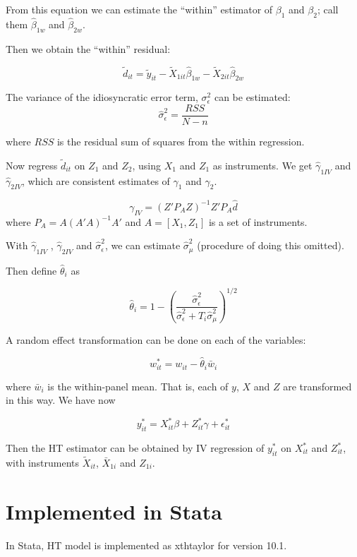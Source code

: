 From this equation we can estimate the ``within'' estimator of
$\beta_1$ and $\beta_2$; call them $\hat \beta_{1w}$ and $\hat
\beta_{2w}$. 

Then we obtain the ``within'' residual:

\[ \tilde d_{it} = \tilde y_{it} - \tilde X_{1it} \hat \beta_{1w} -
\tilde X_{2it} \hat \beta_{2w} \]

The variance of the idiosyncratic error term, $\sigma^2_{\epsilon}$
can be estimated:
\[ \hat \sigma^2_{\epsilon} = \frac{RSS}{N-n} \]

where $RSS$ is the residual sum of squares from the within regression.

Now regress $\tilde d_{it}$ on $Z_1$ and $Z_2$, using $X_1$ and $Z_1$
as instruments.  We get $\hat \gamma_{1IV}$ and $\hat \gamma_{2IV}$,
which are consistent estimates of $\gamma_1$ and $\gamma_2$.

\[ \gamma_{IV}=(Z' P_A Z)^{-1} Z' P_A \hat d \]
where $P_A = A(A'A)^{-1}A' $ and $A= [X_1, Z_1]$ is a set of instruments.

With  $\hat \gamma_{1IV}$ ,  $\hat \gamma_{2IV}$ and $\hat \sigma_{\epsilon}^2$, we can estimate
$\hat \sigma_{\mu}^2$ (procedure of doing this omitted).

Then define $\hat \theta_i$ as

\[\hat \theta_i = 1 - (\frac{\hat \sigma_{\epsilon}^2}{\hat
  \sigma_{\epsilon}^2 + T_i \hat \sigma_{\mu}^2})^{1/2}\]

A random effect transformation can be done on each of the variables:

\[ w_{it}^* = w_{it} - \hat \theta_i \bar w_i \]

where $\bar w_i$ is the within-panel mean.  That is, each of $y$, $X$
and $Z$ are transformed in this way.  We have now 

\[ y_{it}^* = X_{it}^* \beta + Z_{it}^* \gamma + \epsilon_{it}^* \]


Then the HT estimator can be obtained by IV regression of $y_{it}^*$
on $X_{it}^*$ and $Z_{it}^*$, with instruments $\tilde X_{it}$, $\bar
X_{1i}$ and $Z_{1i}$.  

\section{Implemented in Stata}

In Stata, HT model is implemented as xthtaylor for version 10.1.
